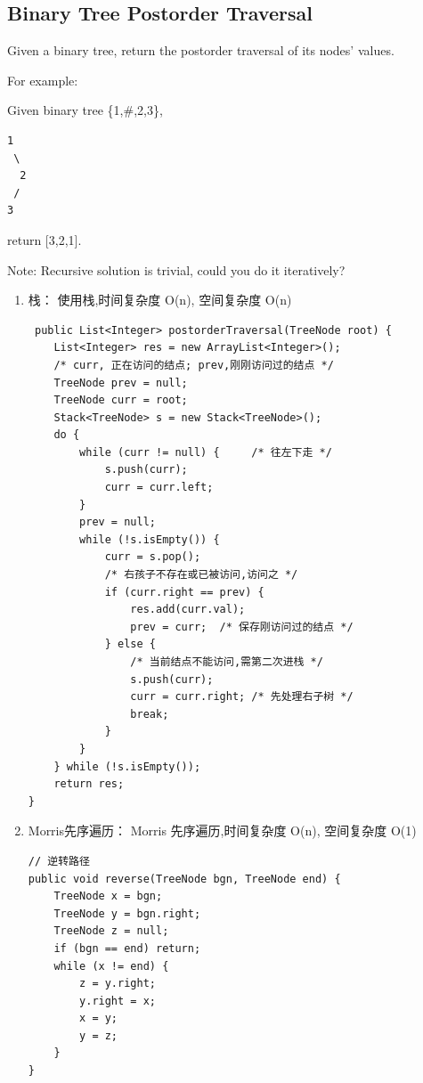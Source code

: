 \documentclass[12pt]{book}
\begin{document}
\subsection{Binary Tree Postorder Traversal}
\label{sec-4-2-3}
Given a binary tree, return the postorder traversal of its nodes' values.

For example:

Given binary tree \{1,\#,2,3\},
\lstset{language=java,label= ,caption= ,numbers=none}
\begin{lstlisting}
1
 \
  2
 /
3
\end{lstlisting}

return [3,2,1].

Note: Recursive solution is trivial, could you do it iteratively?
\begin{enumerate}
\item 栈： 使用栈,时间复杂度 O(n), 空间复杂度 O(n)
\label{sec-4-2-3-1}

\lstset{language=java,label= ,caption= ,numbers=none}
\begin{lstlisting}
 public List<Integer> postorderTraversal(TreeNode root) {
    List<Integer> res = new ArrayList<Integer>();
    /* curr, 正在访问的结点; prev,刚刚访问过的结点 */
    TreeNode prev = null; 
    TreeNode curr = root; 
    Stack<TreeNode> s = new Stack<TreeNode>();
    do {
        while (curr != null) {     /* 往左下走 */
            s.push(curr);
            curr = curr.left;
        }
        prev = null;
        while (!s.isEmpty()) {
            curr = s.pop();
            /* 右孩子不存在或已被访问,访问之 */
            if (curr.right == prev) {
                res.add(curr.val);
                prev = curr;  /* 保存刚访问过的结点 */
            } else {
                /* 当前结点不能访问,需第二次进栈 */
                s.push(curr);
                curr = curr.right; /* 先处理右子树 */
                break;
            }
        }
    } while (!s.isEmpty());
    return res;
}
\end{lstlisting}

\item Morris先序遍历： Morris 先序遍历,时间复杂度 O(n), 空间复杂度 O(1)
\label{sec-4-2-3-2}

\lstset{language=java,label= ,caption= ,numbers=none}
\begin{lstlisting}
// 逆转路径
public void reverse(TreeNode bgn, TreeNode end) {
    TreeNode x = bgn;
    TreeNode y = bgn.right;
    TreeNode z = null;
    if (bgn == end) return;
    while (x != end) {
        z = y.right;
        y.right = x;
        x = y;
        y = z;
    }
}


\end{lstlisting}
\end{enumerate}
\end{document}
